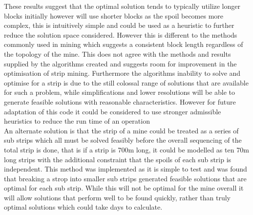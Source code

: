 These results suggest that the optimal solution tends to typically utilize longer blocks initially however will use shorter blocks as the spoil becomes more complex, this is intuitively simple and could be used as a heuristic to further reduce the solution space considered. However this is different to the methods commonly used in mining\cite{IntoOpenPit} which suggests a consistent block length regardless of the topology of the mine. This does not agree with the methods and results supplied by the algorithms created and suggests room for improvement in the optimisation of strip mining. Furthermore the algorithms inability to solve and optimise for a strip is due to the still colossal range of solutions that are available for such a problem, while simplifications and lower resolutions will be able to generate feasible solutions with reasonable characteristics. However for future adaptation of this code it could be considered to use stronger admissible heuristics to reduce the run time of an operation\\An alternate solution is that  the strip of a mine could be treated as a series of sub strips which all must be solved feasibly before the overall sequencing  of the total strip is  done, that is if a strip is 700m long, it could be modelled as ten 70m long strips with the additional constraint that the spoils of each sub strip is independent. This method was implemented as it is simple to test and was found that breaking a strop into smaller sub strips generated feasible solutions that are optimal for each sub strip. While this will not be optimal for the mine overall it will allow solutions that perform well to be found quickly, rather than truly optimal solutions which could take days to calculate. 


